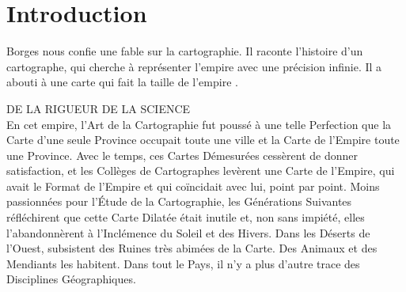 





\chapter*{Introduction}
\newrefsegment








Borges nous confie une fable sur la cartographie. Il raconte l'histoire d'un cartographe, qui cherche à représenter l'empire avec une précision infinie. Il a abouti à une carte qui fait la taille de l'empire \autocite{palsky_borges_1999}.

\begin{authoredquote}
    DE LA RIGUEUR DE LA SCIENCE \\
    
    En cet empire, l'Art de la Cartographie fut poussé à une telle Perfection que la Carte d'une seule Province occupait toute une ville et la Carte de l'Empire toute une Province. Avec le temps, ces Cartes Démesurées cessèrent de donner satisfaction, et les Collèges de Cartographes levèrent une Carte de l'Empire, qui avait le Format de l'Empire et qui coïncidait avec lui, point par point. Moins passionnées pour l'Étude de la Cartographie, les Générations Suivantes réfléchirent que cette Carte Dilatée était inutile et, non sans impiété, elles l'abandonnèrent à l'Inclémence du Soleil et des Hivers. Dans les Déserts de l'Ouest, subsistent des Ruines très abimées de la Carte. Des Animaux et des Mendiants les habitent. Dans tout le Pays, il n'y a plus d'autre trace des Disciplines Géographiques.
\end{authoredquote}

